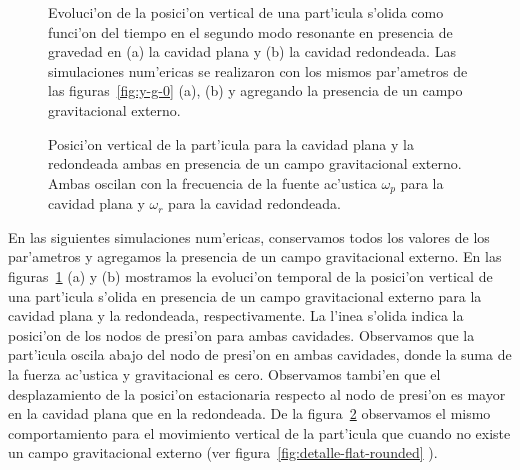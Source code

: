 \begin{figure} 


\vskip 5mm
\caption{\label{fig:path-3} 
Evoluci'on de la posici'on vertical de una part'icula s'olida como funci'on del tiempo
en el segundo modo resonante en presencia de gravedad en (a) la cavidad  plana y (b) la
cavidad  redondeada. Las simulaciones num'ericas se realizaron con los mismos par'ametros 
de las figuras~\ref{fig:y-g-0} (a), (b) y agregando la presencia de un campo gravitacional externo.
}
\end{figure}
\begin{figure} 

%
\caption{\label{fig:detalle-flat-rounded-gravity}
 Posici'on vertical de la part'icula para la cavidad
plana y la redondeada ambas en presencia de un campo gravitacional externo.
Ambas oscilan con la frecuencia de la fuente ac'ustica $\omega_p$
para la cavidad plana y $\omega_r $ para la cavidad redondeada.
}
\end{figure}


En las siguientes simulaciones num'ericas, conservamos todos los valores de los par'ametros y agregamos
la presencia de un campo gravitacional externo. En las figuras~\ref{fig:path-3} (a)
y (b)  mostramos la evoluci'on temporal de la posici'on vertical de una part'icula s'olida en presencia 
de un campo gravitacional externo para la cavidad plana y la redondeada, respectivamente. 
La l'inea s'olida indica la posici'on de los nodos de presi'on para ambas cavidades.
Observamos que la part'icula oscila abajo del nodo de presi'on en ambas cavidades, donde la 
suma de la fuerza ac'ustica y gravitacional es cero. Observamos tambi'en que el desplazamiento 
de la posici'on estacionaria respecto al nodo de presi'on  es mayor 
en la cavidad plana que en la redondeada. De la figura~\ref{fig:detalle-flat-rounded-gravity} observamos  el mismo  
comportamiento para el movimiento vertical de la part'icula que cuando no existe un campo gravitacional externo 
(ver figura~\ref{fig:detalle-flat-rounded} ). 





